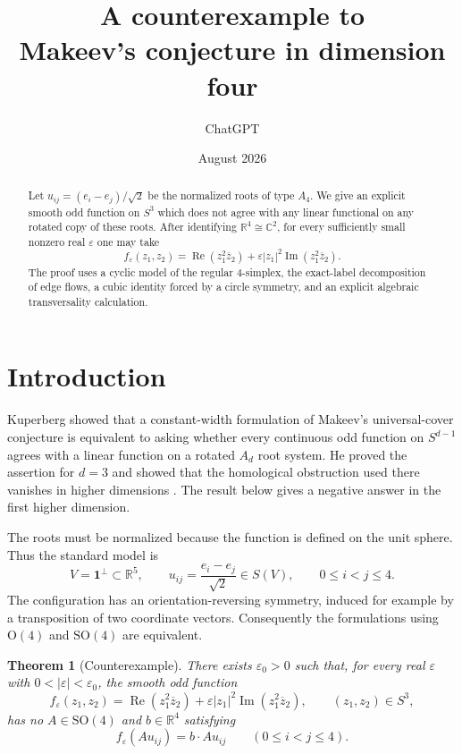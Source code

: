 \documentclass[11pt,reqno]{amsart}
\title[Counterexample in dimension four]{A counterexample to\\Makeev's
conjecture in dimension four}
\author{ChatGPT}
\date{August 2026}
\newtheorem{theorem}{Theorem}[section]
\theoremstyle{remark}
\newcommand{\R}{\mathbb R}
\newcommand{\C}{\mathbb C}
\newcommand{\one}{\mathbf 1}
\newcommand{\SO}{\mathrm{SO}}
\newcommand{\eps}{\varepsilon}
\newcommand{\abs}[1]{\left\lvert #1\right\rvert}
\begin{document}
\begin{abstract}
Let $u_{ij}=(e_i-e_j)/\sqrt2$ be the normalized roots of type $A_4$.
We give an explicit smooth odd function on $S^3$ which does not agree with
any linear functional on any rotated copy of these roots.  After identifying
$\R^4\cong\C^2$, for every sufficiently small nonzero real $\eps$ one may take
\[
 f_\eps(z_1,z_2)
 =\operatorname{Re}(z_1^2\overline z_2)
 +\eps\abs{z_1}^2\operatorname{Im}(z_1^2\overline z_2).
\]
The proof uses a cyclic model of the regular $4$-simplex, the exact-label
decomposition of edge flows, a cubic identity forced by a circle symmetry,
and an explicit algebraic transversality calculation.
\end{abstract}

\maketitle

\section{Introduction}

Kuperberg showed that a constant-width formulation of Makeev's universal-cover
conjecture is equivalent to asking whether every continuous odd function on
$S^{d-1}$ agrees with a linear function on a rotated $A_d$ root system.  He
proved the assertion for $d=3$ and showed that the homological obstruction used
there vanishes in higher dimensions \cite{Kuperberg1999}.  The result below gives a negative answer in the first higher
dimension.

The roots must be normalized because the function is defined on the unit
sphere.  Thus the standard model is
\[
 V=\one^\perp\subset\R^5,
 \qquad
 u_{ij}=\frac{e_i-e_j}{\sqrt2}\in S(V),
 \qquad 0\le i<j\le4.
\]
The configuration has an orientation-reversing symmetry, induced for example
by a transposition of two coordinate vectors.  Consequently the formulations
using $\mathrm O(4)$ and $\SO(4)$ are equivalent.

\begin{theorem}[Counterexample]\label{thm:counterexample}
There exists $\eps_0>0$ such that, for every real $\eps$ with
$0<\abs\eps<\eps_0$, the smooth odd function
\begin{equation}\label{eq:counterexample-function}
 f_\eps(z_1,z_2)
 =\operatorname{Re}(z_1^2\overline z_2)
 +\eps\abs{z_1}^2\operatorname{Im}(z_1^2\overline z_2),
 \qquad (z_1,z_2)\in S^3,
\end{equation}
has no $A\in\SO(4)$ and $b\in\R^4$ satisfying
\[
 f_\eps(Au_{ij})=b\cdot Au_{ij}
 \qquad(0\le i<j\le4).
\]
\end{theorem}
\end{document}

